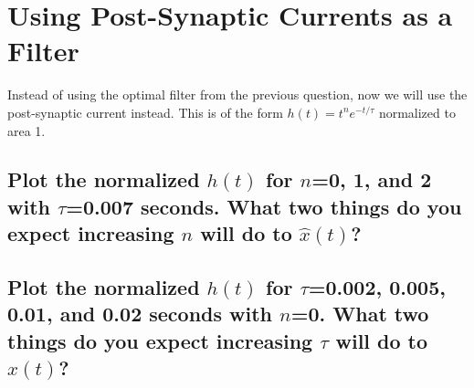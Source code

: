 \documentclass{article}
\begin{document}
\section{Using Post-Synaptic Currents as a Filter}\label{using-post-synaptic-currents-as-a-filter}

Instead of using the optimal filter from the previous question, now we
will use the post-synaptic current instead. This is of the form
$h(t)=t^n e^{-t/\tau}$ normalized to area 1.

\subsection{Plot the normalized $h(t)$ for $n$=0, 1, and 2 with
$\tau$=0.007 seconds. What two things do you expect increasing $n$ will
do to
$\hat{x}(t)$?}\label{a-plot-the-normalized-ht-for-n0-1-and-2-with-tau0.007-seconds.-what-two-things-do-you-expect-increasing-n-will-do-to-hatxt}

\subsection{Plot the normalized $h(t)$ for $\tau$=0.002, 0.005, 0.01,
and 0.02 seconds with $n$=0. What two things do you expect increasing
$\tau$ will do to
$\hat{x}(t)$?}\label{b-plot-the-normalized-ht-for-tau0.002-0.005-0.01-and-0.02-seconds-with-n0.-what-two-things-do-you-expect-increasing-tau-will-do-to-hatxt}
\end{document}
